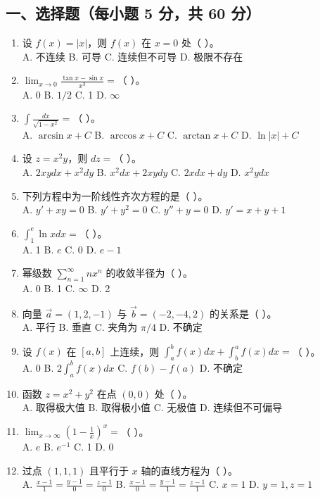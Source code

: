 \documentclass[11pt,a4paper]{article}
\begin{document}
\subsection*{一、选择题（每小题 5 分，共 60 分）}
\begin{enumerate}
    \item 设 $f(x) = |x|$，则 $f(x)$ 在 $x=0$ 处（ ）。 \\
    A. 不连续 \quad B. 可导 \quad C. 连续但不可导 \quad D. 极限不存在
    \item $\lim_{x \to 0} \frac{\tan x - \sin x}{x^3} = $（ ）。 \\
    A. 0 \quad B. $1/2$ \quad C. 1 \quad D. $\infty$
    \item $\int \frac{dx}{\sqrt{1-x^2}} = $（ ）。 \\
    A. $\arcsin x + C$ \quad B. $\arccos x + C$ \quad C. $\arctan x + C$ \quad D. $\ln|x| + C$
    \item 设 $z = x^2 y$，则 $dz = $（ ）。 \\
    A. $2xy dx + x^2 dy$ \quad B. $x^2 dx + 2xy dy$ \quad C. $2x dx + dy$ \quad D. $x^2 y dx$
    \item 下列方程中为一阶线性齐次方程的是（ ）。 \\
    A. $y' + xy = 0$ \quad B. $y' + y^2 = 0$ \quad C. $y'' + y = 0$ \quad D. $y' = x+y+1$
    \item $\int_1^e \ln x dx = $（ ）。 \\
    A. 1 \quad B. $e$ \quad C. 0 \quad D. $e-1$
    \item 幂级数 $\sum_{n=1}^{\infty} n x^n$ 的收敛半径为（ ）。 \\
    A. 0 \quad B. 1 \quad C. $\infty$ \quad D. 2
    \item 向量 $\vec{a} = (1, 2, -1)$ 与 $\vec{b} = (-2, -4, 2)$ 的关系是（ ）。 \\
    A. 平行 \quad B. 垂直 \quad C. 夹角为 $\pi/4$ \quad D. 不确定
    \item 设 $f(x)$ 在 $[a, b]$ 上连续，则 $\int_a^b f(x) dx + \int_b^a f(x) dx = $（ ）。 \\
    A. 0 \quad B. $2\int_a^b f(x) dx$ \quad C. $f(b)-f(a)$ \quad D. 不确定
    \item 函数 $z = x^2 + y^2$ 在点 $(0,0)$ 处（ ）。 \\
    A. 取得极大值 \quad B. 取得极小值 \quad C. 无极值 \quad D. 连续但不可偏导
    \item $\lim_{x \to \infty} (1 - \frac{1}{x})^x = $（ ）。 \\
    A. $e$ \quad B. $e^{-1}$ \quad C. 1 \quad D. 0
    \item 过点 $(1, 1, 1)$ 且平行于 $x$ 轴的直线方程为（ ）。 \\
    A. $\frac{x-1}{1} = \frac{y-1}{0} = \frac{z-1}{0}$ \quad B. $\frac{x-1}{0} = \frac{y-1}{1} = \frac{z-1}{1}$ \quad C. $x=1$ \quad D. $y=1, z=1$
\end{enumerate}
\end{document}

